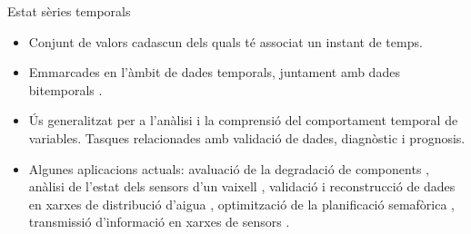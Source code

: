 \begin{frame}{Estat sèries temporals}

  \begin{itemize}

  \item Conjunt de valors cadascun dels quals té associat un instant
    de temps.

  \item Emmarcades en l'àmbit de dades temporals, juntament amb dades
    bitemporals \parencite{assfalg08:thesis}.

  \item Ús generalitzat per a l'anàlisi i la comprensió del
    comportament temporal de variables. Tasques relacionades amb
    validació de dades, diagnòstic i prognosis.

  \item Algunes aplicacions actuals: avaluació de la degradació de
    components \parencite{yu11}, anàlisi de l'estat dels sensors d'un
    vaixell \parencite{palmer07}, validació i reconstrucció de dades
    en xarxes de distribució d'aigua \parencite{quevedo10},
    optimització de la planificació semafòrica \parencite{last11},
    transmissió d'informació en xarxes de
    sensors \parencite{jainagrawal05}.


  \end{itemize}

\end{frame}



